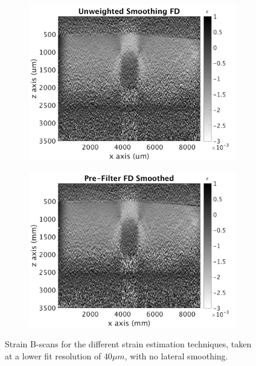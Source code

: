 \begin{figure}[h]
\begin{subfigure}{0.49\textwidth}
        \includegraphics[width=\textwidth]{appendix_figs/uwfd_fr40_lr0.png}
    \end{subfigure}
    \begin{subfigure}{0.49\textwidth}
    	\centering
        \includegraphics[width=\textwidth]{appendix_figs/fdsm_fr40_lr0.png}
    \end{subfigure}    
    \caption{Strain B-scans for the different strain estimation techniques, taken at a lower fit resolution of $40\mu m$, with no lateral smoothing.}
	\label{fr40_lr0}
\end{figure}

